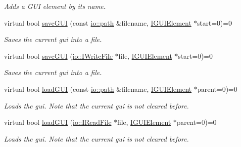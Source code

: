 \begin{DoxyCompactItemize}
\begin{DoxyCompactList}\small\item\em Adds a G\+UI element by its name. \end{DoxyCompactList}\item 
virtual bool \hyperlink{classirr_1_1gui_1_1IGUIEnvironment_ac5e7b39ff2292983660a5e5999b240b3}{save\+G\+UI} (const \hyperlink{namespaceirr_1_1io_a6468281622ce3a1c46b72e19f32dded5}{io\+::path} \&filename, \hyperlink{classirr_1_1gui_1_1IGUIElement}{I\+G\+U\+I\+Element} $\ast$start=0)=0
\begin{DoxyCompactList}\small\item\em Saves the current gui into a file. \end{DoxyCompactList}\item 
virtual bool \hyperlink{classirr_1_1gui_1_1IGUIEnvironment_a39fdeef8455813a2be2bce9212ec758a}{save\+G\+UI} (\hyperlink{classirr_1_1io_1_1IWriteFile}{io\+::\+I\+Write\+File} $\ast$file, \hyperlink{classirr_1_1gui_1_1IGUIElement}{I\+G\+U\+I\+Element} $\ast$start=0)=0
\begin{DoxyCompactList}\small\item\em Saves the current gui into a file. \end{DoxyCompactList}\item 
virtual bool \hyperlink{classirr_1_1gui_1_1IGUIEnvironment_a6e847a40e5c97c846f2d654605ae13a0}{load\+G\+UI} (const \hyperlink{namespaceirr_1_1io_a6468281622ce3a1c46b72e19f32dded5}{io\+::path} \&filename, \hyperlink{classirr_1_1gui_1_1IGUIElement}{I\+G\+U\+I\+Element} $\ast$parent=0)=0
\begin{DoxyCompactList}\small\item\em Loads the gui. Note that the current gui is not cleared before. \end{DoxyCompactList}\item 
virtual bool \hyperlink{classirr_1_1gui_1_1IGUIEnvironment_a23e53c388d45358c53304d095f0b029b}{load\+G\+UI} (\hyperlink{classirr_1_1io_1_1IReadFile}{io\+::\+I\+Read\+File} $\ast$file, \hyperlink{classirr_1_1gui_1_1IGUIElement}{I\+G\+U\+I\+Element} $\ast$parent=0)=0
\begin{DoxyCompactList}\small\item\em Loads the gui. Note that the current gui is not cleared before. \end{DoxyCompactList}\item 
\mbox{\label{classirr_1_1gui_1_1IGUIEnvironment_a6342ec41dcd9fbd3f587dce369d11b34}} 

\end{DoxyCompactItemize}
